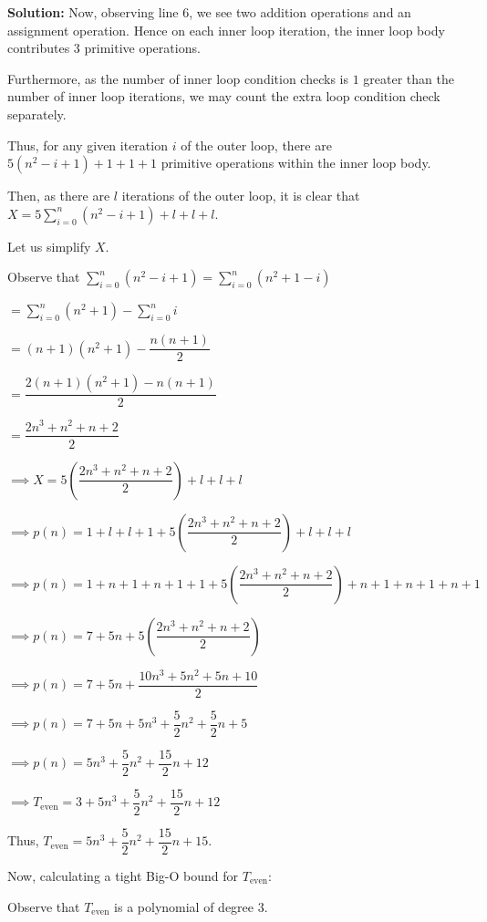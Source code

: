 \documentclass[a4,13pt]{extarticle}
\newenvironment{Solution}{\color{blue}\textbf{Solution:}}{}
\begin{document}
\begin{enumerate}
\begin{enumerate}
\begin{Solution}
Now, observing line $6$, we see two addition operations and an assignment operation. Hence on each inner loop iteration, the inner loop body contributes $3$ primitive operations.

Furthermore, as the number of inner loop condition checks is $1$ greater than the number of inner loop iterations, we may count the extra loop condition check separately.

Thus, for any given iteration $i$ of the outer loop, there are $5\left(n^2-i+1\right)+1+1+1$ primitive operations within the inner loop body.

Then, as there are $l$ iterations of the outer loop, it is clear that $X=5\displaystyle\sum_{i=0}^n\left(n^2-i+1\right)+l+l+l$.

Let us simplify $X$.

\begin{center}
Observe that $\displaystyle\sum_{i=0}^n\left(n^2-i+1\right)=\displaystyle\sum_{i=0}^n\left(n^2+1-i\right)$

$=\displaystyle\sum_{i=0}^n\left(n^2+1\right)-\displaystyle\sum_{i=0}^ni$

$=\left(n+1\right)\left(n^2+1\right)-\dfrac{n\left(n+1\right)}2$

$=\dfrac{2\left(n+1\right)\left(n^2+1\right)-n\left(n+1\right)}2$

$=\dfrac{2n^3+n^2+n+2}2$

$\implies X=5\left(\dfrac{2n^3+n^2+n+2}2\right)+l+l+l$

$\implies p(n)=1+l+l+1+5\left(\dfrac{2n^3+n^2+n+2}2\right)+l+l+l$

$\implies p(n)=1+n+1+n+1+1+5\left(\dfrac{2n^3+n^2+n+2}2\right)+n+1+n+1+n+1$

$\implies p(n)=7+5n+5\left(\dfrac{2n^3+n^2+n+2}2\right)$

$\implies p(n)=7+5n+\dfrac{10n^3+5n^2+5n+10}2$

$\implies p(n)=7+5n+5n^3+\dfrac52n^2+\dfrac52n+5$

$\implies p(n)=5n^3+\dfrac52n^2+\dfrac{15}2n+12$

$\implies T_{\text{even}}=3+5n^3+\dfrac52n^2+\dfrac{15}2n+12$

\end{center}

Thus, $T_{\text{even}}=5n^3+\dfrac52n^2+\dfrac{15}2n+15$.

Now, calculating a tight Big-O bound for $T_{\text{even}}$:

Observe that $T_{\text{even}}$ is a polynomial of degree $3$.


\end{Solution}
\end{enumerate}
\end{enumerate}
\end{document}
